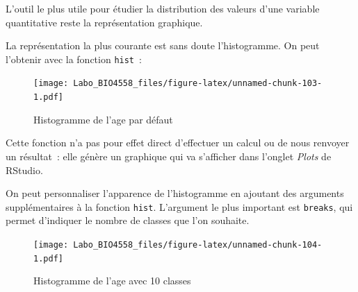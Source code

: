 \documentclass[
  12pt,
]{book}
\newenvironment{Shaded}{\begin{snugshade}}{\end{snugshade}}
\newcommand{\DataTypeTok}[1]{\textcolor[rgb]{0.13,0.29,0.53}{#1}}
\newcommand{\DecValTok}[1]{\textcolor[rgb]{0.00,0.00,0.81}{#1}}
\newcommand{\KeywordTok}[1]{\textcolor[rgb]{0.13,0.29,0.53}{\textbf{#1}}}
\newcommand{\NormalTok}[1]{#1}
\newcommand{\OperatorTok}[1]{\textcolor[rgb]{0.81,0.36,0.00}{\textbf{#1}}}
\newcommand{\StringTok}[1]{\textcolor[rgb]{0.31,0.60,0.02}{#1}}
\begin{document}
L'outil le plus utile pour étudier la distribution des valeurs d'une variable quantitative reste la représentation graphique.

La représentation la plus courante est sans doute l'histogramme. On peut l'obtenir avec la fonction \texttt{hist}~:

\begin{Shaded}
\end{Shaded}

\begin{figure}
\centering
\texttt{[image: Labo\_BIO4558\_files/figure-latex/unnamed-chunk-103-1.pdf]}
\caption{\label{fig:unnamed-chunk-103}Histogramme de l'age par défaut}
\end{figure}

Cette fonction n'a pas pour effet direct d'effectuer un calcul ou de nous renvoyer un résultat~: elle génère un graphique qui va s'afficher dans l'onglet \emph{Plots} de RStudio.

On peut personnaliser l'apparence de l'histogramme en ajoutant des arguments supplémentaires à la fonction \texttt{hist}. L'argument le plus important est \texttt{breaks}, qui permet d'indiquer le nombre de classes que l'on souhaite.

\begin{Shaded}
\end{Shaded}

\begin{figure}
\centering
\texttt{[image: Labo\_BIO4558\_files/figure-latex/unnamed-chunk-104-1.pdf]}
\caption{\label{fig:unnamed-chunk-104}Histogramme de l'age avec 10 classes}
\end{figure}

\begin{Shaded}
\end{Shaded}
\end{document}
